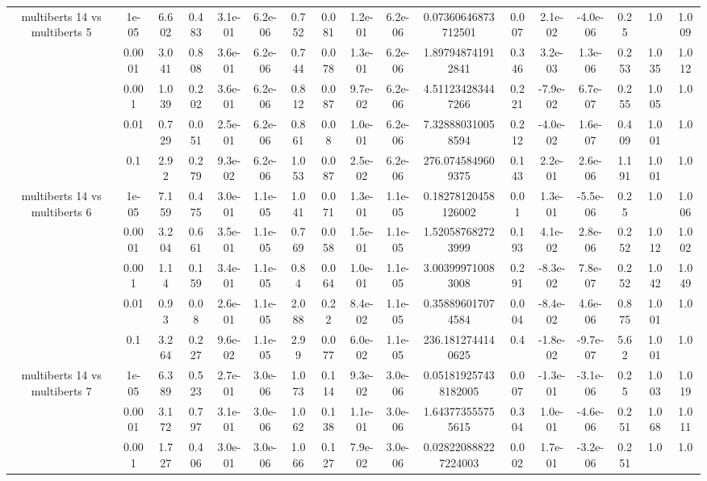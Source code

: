 \begin{tabular}{|c|c|c|c|c|c|c|c|c|c|c|c|c|c|c|c|c|}
\hline
\multirow{5}{*}{multiberts 14 vs multiberts 5} & 1e-05 & 6.602 & 0.483 & 3.1e-01 & 6.2e-06 & 0.752 & 0.081 & 1.2e-01 & 6.2e-06 & 0.07360646873712501 & 0.007 & 2.1e-02 & -4.0e-06 & 0.25 & 1.0 & 1.009 \\
 & 0.0001 & 3.041 & 0.808 & 3.6e-01 & 6.2e-06 & 0.744 & 0.078 & 1.3e-01 & 6.2e-06 & 1.897948741912841 & 0.346 & 3.2e-03 & 1.3e-06 & 0.253 & 1.035 & 1.012 \\
 & 0.001 & 1.039 & 0.202 & 3.6e-01 & 6.2e-06 & 0.812 & 0.087 & 9.7e-02 & 6.2e-06 & 4.511234283447266 & 0.221 & -7.9e-02 & 6.7e-07 & 0.255 & 1.005 & 1.0 \\
 & 0.01 & 0.729 & 0.051 & 2.5e-01 & 6.2e-06 & 0.861 & 0.08 & 1.0e-01 & 6.2e-06 & 7.328880310058594 & 0.212 & -4.0e-02 & 1.6e-07 & 0.409 & 1.001 & 1.0 \\
 & 0.1 & 2.92 & 0.279 & 9.3e-02 & 6.2e-06 & 1.053 & 0.087 & 2.5e-02 & 6.2e-06 & 276.0745849609375 & 0.143 & 2.2e-01 & 2.6e-06 & 1.191 & 1.001 & 1.0 \\
\hline
\multirow{5}{*}{multiberts 14 vs multiberts 6} & 1e-05 & 7.159 & 0.475 & 3.0e-01 & 1.1e-05 & 1.041 & 0.071 & 1.3e-01 & 1.1e-05 & 0.18278120458126002 & 0.01 & 1.3e-01 & -5.5e-06 & 0.25 & 1.0 & 1.006 \\
 & 0.0001 & 3.204 & 0.661 & 3.5e-01 & 1.1e-05 & 0.769 & 0.058 & 1.5e-01 & 1.1e-05 & 1.520587682723999 & 0.193 & 4.1e-02 & 2.8e-06 & 0.252 & 1.012 & 1.002 \\
 & 0.001 & 1.14 & 0.159 & 3.4e-01 & 1.1e-05 & 0.84 & 0.064 & 1.0e-01 & 1.1e-05 & 3.003999710083008 & 0.291 & -8.3e-02 & 7.8e-07 & 0.252 & 1.042 & 1.049 \\
 & 0.01 & 0.93 & 0.08 & 2.6e-01 & 1.1e-05 & 2.088 & 0.22 & 8.4e-02 & 1.1e-05 & 0.358896017074584 & 0.004 & -8.4e-02 & 4.6e-06 & 0.875 & 1.001 & 1.0 \\
 & 0.1 & 3.264 & 0.227 & 9.6e-02 & 1.1e-05 & 2.99 & 0.077 & 6.0e-02 & 1.1e-05 & 236.1812744140625 & 0.4 & -1.8e-02 & -9.7e-07 & 5.62 & 1.001 & 1.0 \\
\hline
\multirow{5}{*}{multiberts 14 vs multiberts 7} & 1e-05 & 6.389 & 0.523 & 2.7e-01 & 3.0e-06 & 1.073 & 0.114 & 9.3e-02 & 3.0e-06 & 0.051819257438182005 & 0.007 & -1.3e-01 & -3.1e-06 & 0.25 & 1.003 & 1.019 \\
 & 0.0001 & 3.172 & 0.797 & 3.1e-01 & 3.0e-06 & 1.062 & 0.138 & 1.1e-01 & 3.0e-06 & 1.643773555755615 & 0.304 & 1.0e-01 & -4.6e-06 & 0.251 & 1.068 & 1.011 \\
 & 0.001 & 1.727 & 0.406 & 3.0e-01 & 3.0e-06 & 1.066 & 0.127 & 7.9e-02 & 3.0e-06 & 0.028220888227224003 & 0.002 & 1.7e-01 & -3.2e-06 & 0.251 & 1.0 & 1.0 \\

\end{tabular}
